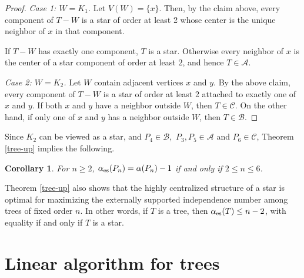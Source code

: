 \documentclass[11pt]{article}
\newtheorem{corollary}[theorem]{Corollary}
\newcommand{\es}{\alpha_{\rm es}}
\begin{document}
\begin{proof}
\smallskip\noindent
\emph{Case 1: $W=K_1$.}
Let $V(W)=\{x\}$. Then, by the claim above, every component of $T-W$ is a star of order at least 2 whose center is the unique neighbor of $x$ in that component.

If $T-W$ has exactly one component, $T$ is a star. Otherwise every neighbor of $x$ is the center of a star component of order at least $2$, and hence $T\in\mathcal{A}$.

\smallskip\noindent
\emph{Case 2: $W=K_2$.} Let $W$ contain adjacent vertices $x$ and $y$.
By the above claim, every component of $T-W$ is a star of order at least 2 attached to exactly one of $x$ and $y$. If both $x$ and $y$ have a
neighbor outside $W$, then $T\in\mathcal{C}$. On the other hand, if only one of $x$ and $y$ has a neighbor outside $W$, then $T\in\mathcal{B}$.
\end{proof}



Since $K_2$ can be viewed as a star, and $P_4 \in \mathcal{B}$,\, $P_3, P_5\in \mathcal{A}$ and  $P_6\in \mathcal{C}$, Theorem \ref{tree-up} implies the following.

\begin{corollary}
For $n\ge 2$, $\es(P_n)=\alpha(P_n)-1$ if and only if $2\le n\le 6$.
\end{corollary}

Theorem \ref{tree-up}  also shows that the highly centralized structure of a star is optimal for maximizing the externally supported independence number among trees of fixed order $n$. In other words, if $T$ is a tree, then $\es(T)\le n-2$, with equality if and only if $T$ is a star.


\medskip

\section{Linear algorithm for trees}
\end{document}
